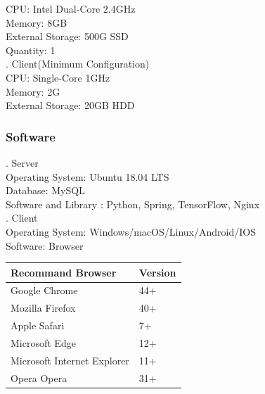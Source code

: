 \documentclass[16pt]{scrreprt}
\begin{document}
 
CPU: Intel Dual-Core 2.4GHz\\

 
Memory: 8GB\\

 
External Storage: 500G SSD\\

 
Quantity: 1\\

 
. Client(Minimum Configuration)\\

 
CPU: Single-Core 1GHz\\

 
Memory: 2G\\

 
External Storage: 20GB HDD\\

 
\subsubsection{Software}

 
. Server\\

 
Operating System: Ubuntu 18.04 LTS\\

 
Database: MySQL\\

 
Software and Library : Python, Spring, TensorFlow, Nginx\\

 
. Client\\

 
Operating System: Windows/macOS/Linux/Android/IOS\\

 
Software: Browser\\

 
\begin{center}
    \begin{tabular}{p{7cm}p{7cm}}
        \hline
	    Recommand Browser & Version\\
        \hline
	    Google Chrome &  44+\\
        \hline
	    Mozilla Firefox & 40+\\
        \hline
        Apple Safari & 7+\\
        \hline
        Microsoft Edge & 12+\\
        \hline
        Microsoft Internet Explorer & 11+\\
        \hline
        Opera Opera & 31+\\
        \hline

 
    \end{tabular}
\end{center}
\end{document}
